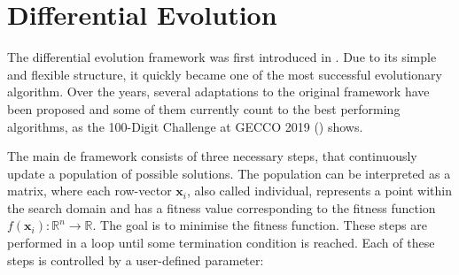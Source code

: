 \documentclass[./\jobname.tex]{subfiles}
\begin{document}
\section{Differential Evolution}

The differential evolution framework was first introduced in \cite{storn_differential_1997}. Due to its simple and flexible structure, it quickly became one of the most successful evolutionary algorithm. Over the years, several adaptations to the original framework have been proposed and some of them currently count to the best performing algorithms, as the 100-Digit Challenge at GECCO 2019 (\cite{suganthan_suganthancec2019_2020}) shows. 

The main \gls{de} framework consists of three necessary steps, that continuously update a population of possible solutions. The population can be interpreted as a matrix, where each row-vector $\mathbf{x}_i$, also called individual, represents a point within the search domain and has a fitness value corresponding to the fitness function $f(\mathbf{x}_i): \mathbb{R}^n \rightarrow \mathbb{R}$. The goal is to minimise the fitness function. These steps are performed in a loop until some termination condition is reached. Each of these steps is controlled by a user-defined parameter: 
\end{document}
